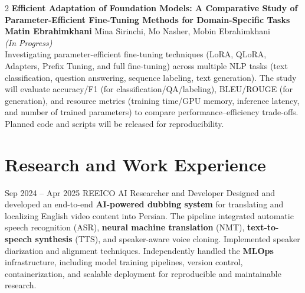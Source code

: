 \documentclass[
	8pt, %
]{FreemanCV}
\begin{document}
\begin{paracol}{2}
\textbf{Efficient Adaptation of Foundation Models: A Comparative Study of Parameter-Efficient Fine-Tuning Methods for Domain-Specific Tasks} \\
\textbf{Matin Ebrahimkhani} Mina Sirinchi, Mo Nasher, Mobin Ebrahimkhani \\
\textit{(In Progress)} \\
Investigating parameter-efficient fine-tuning techniques (LoRA, QLoRA, Adapters, Prefix Tuning, and full fine-tuning) across multiple NLP tasks (text classification, question answering, sequence labeling, text generation). The study will evaluate accuracy/F1 (for classification/QA/labeling), BLEU/ROUGE (for generation), and resource metrics (training time/GPU memory, inference latency, and number of trained parameters) to compare performance–efficiency trade-offs. Planned code and scripts will be released for reproducibility.
\medbreak
\medbreak




\section{Research and Work Experience}




\sloppy
\jobentry
	{Sep 2024 -- Apr 2025} %
	{} %
	{REEICO} %
	{AI Researcher and Developer} %
	  {Designed and developed an end-to-end \textbf{AI-powered dubbing system} for translating and localizing English video content into Persian. The pipeline integrated automatic speech recognition (ASR), \textbf{neural machine translation} (NMT), \textbf{text-to-speech synthesis} (TTS), and speaker-aware voice cloning. Implemented speaker diarization and alignment techniques.  Independently handled the \textbf{MLOps} infrastructure, including model training pipelines, version control, containerization, and scalable deployment for reproducible and maintainable research. } %



\end{paracol}
\end{document}
